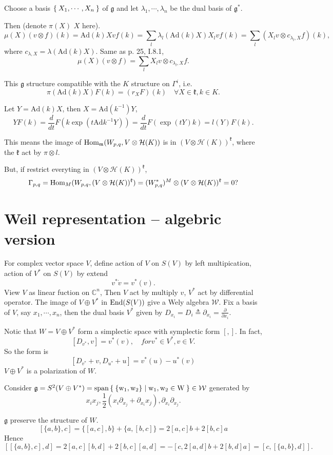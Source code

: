\documentclass[12pt]{amsart}
\def\Hom{{\rm Hom}}
\def\End{{\rm End}}
\def\bC{{\mathbb{C}}}
\def\sspan{\rm{span}}
\def\Ad{{\rm Ad}}
\def\Ad{\mathrm{Ad}}
\def\fgg{\mathfrak{g}}
\def\fkk{\mathfrak{k}}
\def\chh{\mathcal{H}}
\def\cww{\mathcal{W}}
\def\fmm{\mathfrak{m}}
\begin{document}
Choose a basis $\Set{X_1, \cdots, X_n}$ of $\fgg$ and 
let $\lambda_1, \cdots,\lambda_n$ be the dual basis of $\fgg^*$.

Then (denote $\pi(X)$ $X$ here). 
\[
\mu(X) (v\otimes f)(k) = \Ad(k) X v f(k) = 
\sum_{l} \lambda_l(\Ad(k)X) X_l v f(k) 
= \sum_{l} (X_l v \otimes c_{\lambda_l,X} f)(k),
\]
where $c_{\lambda,X} = \lambda(\Ad(k)X)$.
Same as \cite{BorelWallach2000} p. 25, I.8.1,
\[
\mu(X) (v\otimes f) = \sum_l X_l v \otimes c_{\lambda_l,X} f. 
\]

This $\fgg$ structure compatible with the $K$ structure on $\Gamma^i$, i.e. 
\[
\pi(\Ad(k) X) F(k) = (r_X F)(k)\quad \forall X\in \fkk, k\in K.
\]

Let $Y=\Ad(k)X$, then $X = \Ad(k^{-1})Y$,
\[
YF(k) = \frac{d}{dt} F(k\exp(t\Ad k^{-1}Y))
= \frac{d}{dt} F(\exp(tY)k)
= l(Y)F (k). 
\]

This means the image of $\Hom_\fmm(W_{p,q},V\otimes \chh(K))$ is in 
$(V\otimes \chh(K))^\fkk$, where the $\fkk$ act by $\pi\otimes l$.

But, if restrict everyting in $(V\otimes \chh(K))^\fkk$, 
\[
\Gamma_{p,q} = \Hom_M(W_{p,q}, (V\otimes \chh(K))^\fkk)
=(W_{p,q}^*)^M \otimes (V\otimes \chh(K))^\fkk=0?
\] 


\section{Weil representation -- algebric version}
 For complex vector space $V$, define action of $V$ on $S(V)$
 by left multipication, action of $V^*$ on $S(V)$ by extend
\[
v^* \dot v = v^*(v).
\]
View $V$ as linear fuction on $\bC^n$, 
Then $V$ act by multiply $v$, 
$V^*$ act by differential operator. The image of $V\oplus V^*$
in $\End(S(V))$ give a Wely algebra $\cww$. 
Fix a basis of $V$, say $x_1, \cdots, x_n$, 
then the dual basis $V^*$ given by 
$D_{x_i} = D_i \triangleq \partial_{x_i}=  \frac{\partial}{\partial x_i}$.

Notic that $W=V\oplus V^*$ form a simplectic space 
 with symplectic form $[,]$.
In fact, 
\[
[D_{v^*},v] = v^*(v), \quad for v^*\in V^*, v\in V.
\] 
So the form is 
\[
[D_{v^*}+v,D_{u^*}+u] = v^*(u) - u^*(v)
\]
$V\oplus V^*$ is a polarization of $W$.

Consider $\fgg = S^2(V\oplus V^*) = \sspan\Set{\{w_1,w_2\}|w_1,w_2\in W}\in \cww$
generated by 
\[
x_ix_j, \frac{1}{2}(x_i \partial_{x_j} + \partial_{x_i} x_j), 
\partial_{x_i}\partial_{x_j}.
\]


$\fgg$ preserve the structure of $W$. 
\[
[\{a,b\},c] = \{[a,c],b\} + \{a,[b,c]\} = 2[a,c]b + 2[b,c]a
\]
Hence
\[
[[\{a,b\},c],d] = 2[a,c][b,d]+2[b,c][a,d] =  -[c,2[a,d]b+2[b,d]a]
=[c,[\{a,b\},d]].
\]
\end{document}

